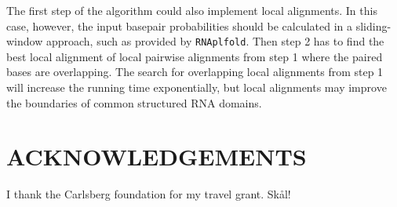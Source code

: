 \documentclass[a4paper,twoside]{article}
\newcommand\rnaplfold{\texttt{RNAplfold}}
\begin{document}
The first step of the algorithm could also implement local alignments. In this
case, however, the input basepair probabilities should be calculated in a
sliding-window approach, such as provided by \rnaplfold.  Then step 2 has to
find the best local alignment of local pairwise alignments from step 1 where the
paired bases are overlapping.  The search for overlapping local alignments from
step 1 will increase the running time exponentially, but local alignments may
improve the boundaries of common structured RNA domains.


\section*{\uppercase{Acknowledgements}}

\noindent I thank the Carlsberg foundation for my travel grant. Sk\aa l!


\vfill

{\small
}


\vfill
\end{document}
